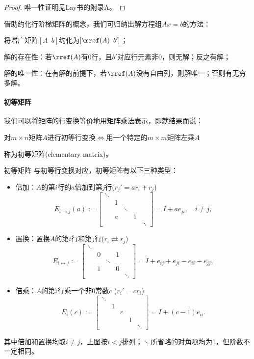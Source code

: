 \begin{proof}
	唯一性证明见Lay书的附录A。
\end{proof}

\begin{remark}
	借助约化行阶梯矩阵的概念，我们可归纳出解方程组$Ax=b$的方法：
	\begin{compactitem}
		\item 将增广矩阵$[A\enspace b]$约化为$[\rref(A)\enspace b']$；
		\item 解的存在性：若$\rref(A)$有0行，且$b'$对应行元素非0，则无解；反之有解；
		\item 解的唯一性：在有解的前提下，若$\rref(A)$没有自由列，则解唯一；否则有无穷多解。
	\end{compactitem}
\end{remark}

\paragraph{初等矩阵}

我们可以将矩阵的行变换等价地用矩阵乘法表示，即就结果而说：
\begin{center}
	对$m\times n$矩阵$A$进行初等行变换$\iff$用一个特定的$m\times m$矩阵左乘$A$
\end{center}
称为初等矩阵(elementary matrix)。

\begin{definition}
	{初等矩阵}{}
	与初等行变换对应，初等矩阵有以下三种类型：
	\begin{itemize}
		\item 倍加：$A$的第$i$行的$a$倍加到第$j$行($r_j'=ar_i+r_j$)
		\[
			E_{i\to j}(a):=
			\begin{bmatrix}
				\ddots\\ &1\\ &&\ddots\\ &a&&1\\ &&&&\ddots
			\end{bmatrix}=I+ae_{ji},\quad i\neq j,
		\]
		\item 置换：置换$A$的第$i$行和第$j$行($r_i\rightleftarrows r_j$)
		\[
			E_{i\leftrightarrow j}:=
			\begin{bmatrix}
				\ddots\\ &0&&1\\ &&\ddots\\ &1&&0\\ &&&&\ddots
			\end{bmatrix}=I+e_{ij}+e_{ji}-e_{ii}-e_{jj},
		\]
		\item 倍乘：$A$的第$i$行乘一个非0常数$c$ ($r_i'=cr_i$)
		\[
			E_i(c):=
			\begin{bmatrix}
				\ddots\\ &1\\ &&c\\ &&&1\\ &&&&\ddots
			\end{bmatrix}=I+(c-1)e_{ii}.
		\]
	\end{itemize}
	其中倍加和置换均取$i\neq j$，上图按$i<j$排列；$\ddots$所省略的对角项均为1，但阶数不一定相同。
\end{definition}

